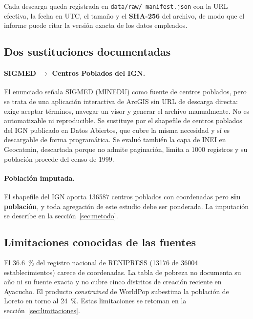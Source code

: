\documentclass[11pt,a4paper]{article}
\begin{document}
Cada descarga queda registrada en \texttt{data/raw/\_manifest.json} con la URL efectiva, la
fecha en UTC, el tamaño y el \textbf{SHA-256} del archivo, de modo que el informe puede citar
la versión exacta de los datos empleados.

\subsection{Dos sustituciones documentadas}

\paragraph{SIGMED $\rightarrow$ Centros Poblados del IGN.} El enunciado señala SIGMED
(MINEDU) como fuente de centros poblados, pero se trata de una aplicación interactiva de
ArcGIS sin URL de descarga directa: exige aceptar términos, navegar un visor y generar el
archivo manualmente. No es automatizable ni reproducible. Se sustituye por el shapefile de
centros poblados del IGN publicado en Datos Abiertos, que cubre la misma necesidad y sí es
descargable de forma programática. Se evaluó también la capa de INEI en Geocatmin, descartada
porque no admite paginación, limita a \num{1000} registros y su población procede del censo
de 1999.

\paragraph{Población imputada.} El shapefile del IGN aporta \num{136587} centros poblados con
coordenadas pero \textbf{sin población}, y toda agregación de este estudio debe ser ponderada.
La imputación se describe en la sección~\ref{sec:metodo}.

\subsection{Limitaciones conocidas de las fuentes}

El \SI{36.6}{\percent} del registro nacional de RENIPRESS (\num{13176} de \num{36004}
establecimientos) carece de coordenadas. La tabla de pobreza no documenta su año ni su fuente
exacta y no cubre cinco distritos de creación reciente en Ayacucho. El producto
\emph{constrained} de WorldPop subestima la población de Loreto en torno al
\SI{24}{\percent}. Estas limitaciones se retoman en la sección~\ref{sec:limitaciones}.

\end{document}
